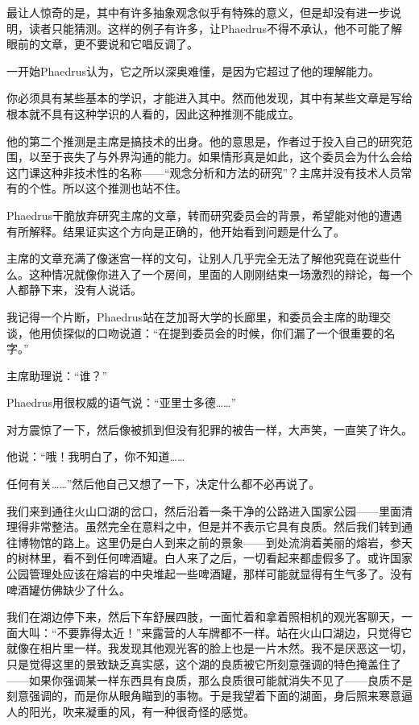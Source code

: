 \documentclass[UTF8]{article}
\begin{document}
\par 最让人惊奇的是，其中有许多抽象观念似乎有特殊的意义，但是却没有进一步说明，读者只能猜测。这样的例子有许多，让Phaedrus不得不承认，他不可能了解眼前的文章，更不要说和它唱反调了。
\par 一开始Phaedrus认为，它之所以深奥难懂，是因为它超过了他的理解能力。
\par 你必须具有某些基本的学识，才能进入其中。然而他发现，其中有某些文章是写给根本就不具有这种学识的人看的，因此这种推测不能成立。
\par 他的第二个推测是主席是搞技术的出身。他的意思是，作者过于投入自己的研究范围，以至于丧失了与外界沟通的能力。如果情形真是如此，这个委员会为什么会给这门课这种非技术性的名称——“观念分析和方法的研究”？主席并没有技术人员常有的个性。所以这个推测也站不住。
\par Phaedrus干脆放弃研究主席的文章，转而研究委员会的背景，希望能对他的遭遇有所解释。结果证实这个方向是正确的，他开始看到问题是什么了。
\par 主席的文章充满了像迷宫一样的文句，让别人几乎完全无法了解他究竟在说些什么。这种情况就像你进入了一个房间，里面的人刚刚结束一场激烈的辩论，每一个人都静下来，没有人说话。
\par 我记得一个片断，Phaedrus站在芝加哥大学的长廊里，和委员会主席的助理交谈，他用侦探似的口吻说道：“在提到委员会的时候，你们漏了一个很重要的名字。”
\par 主席助理说：“谁？”
\par Phaedrus用很权威的语气说：“亚里士多德……”
\par 对方震惊了一下，然后像被抓到但没有犯罪的被告一样，大声笑，一直笑了许久。
\par 他说：“哦！我明白了，你不知道……
\par 任何有关……”然后他自己又想了一下，决定什么都不必再说了。
\par 我们来到通往火山口湖的岔口，然后沿着一条干净的公路进入国家公园——里面清理得非常整洁。虽然完全在意料之中，但是并不表示它具有良质。然后我们转到通往博物馆的路上。这里仍是白人到来之前的景象——到处流淌着美丽的熔岩，参天的树林里，看不到任何啤酒罐。白人来了之后，一切看起来都虚假多了。或许国家公园管理处应该在熔岩的中央堆起一些啤酒罐，那样可能就显得有生气多了。没有啤酒罐仿佛缺少了什么。
\par 我们在湖边停下来，然后下车舒展四肢，一面忙着和拿着照相机的观光客聊天，一面大叫：“不要靠得太近！”来露营的人车牌都不一样。站在火山口湖边，只觉得它就像在相片里一样。我发现其他观光客的脸上也是一片木然。我不是厌恶这一切，只是觉得这里的景致缺乏真实感，这个湖的良质被它所刻意强调的特色掩盖住了——如果你强调某一样东西具有良质，那么良质很可能就消失不见了——良质不是刻意强调的，而是你从眼角瞄到的事物。于是我望着下面的湖面，身后照来寒意逼人的阳光，吹来凝重的风，有一种很奇怪的感觉。
\end{document}
